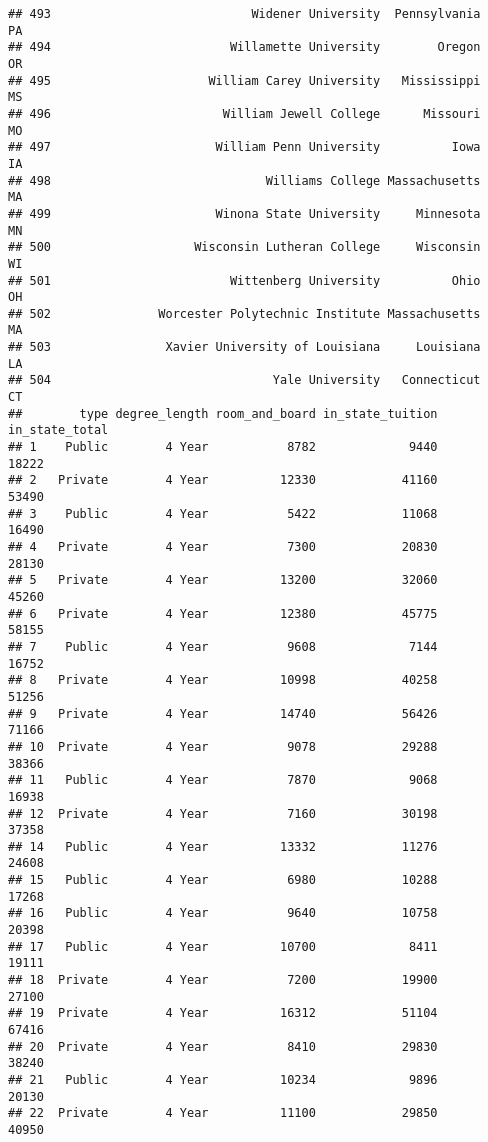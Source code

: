 \documentclass[
]{article}
\begin{document}
\begin{verbatim}
## 493                            Widener University  Pennsylvania         PA
## 494                         Willamette University        Oregon         OR
## 495                      William Carey University   Mississippi         MS
## 496                        William Jewell College      Missouri         MO
## 497                       William Penn University          Iowa         IA
## 498                              Williams College Massachusetts         MA
## 499                       Winona State University     Minnesota         MN
## 500                    Wisconsin Lutheran College     Wisconsin         WI
## 501                         Wittenberg University          Ohio         OH
## 502               Worcester Polytechnic Institute Massachusetts         MA
## 503                Xavier University of Louisiana     Louisiana         LA
## 504                               Yale University   Connecticut         CT
##        type degree_length room_and_board in_state_tuition in_state_total
## 1    Public        4 Year           8782             9440          18222
## 2   Private        4 Year          12330            41160          53490
## 3    Public        4 Year           5422            11068          16490
## 4   Private        4 Year           7300            20830          28130
## 5   Private        4 Year          13200            32060          45260
## 6   Private        4 Year          12380            45775          58155
## 7    Public        4 Year           9608             7144          16752
## 8   Private        4 Year          10998            40258          51256
## 9   Private        4 Year          14740            56426          71166
## 10  Private        4 Year           9078            29288          38366
## 11   Public        4 Year           7870             9068          16938
## 12  Private        4 Year           7160            30198          37358
## 14   Public        4 Year          13332            11276          24608
## 15   Public        4 Year           6980            10288          17268
## 16   Public        4 Year           9640            10758          20398
## 17   Public        4 Year          10700             8411          19111
## 18  Private        4 Year           7200            19900          27100
## 19  Private        4 Year          16312            51104          67416
## 20  Private        4 Year           8410            29830          38240
## 21   Public        4 Year          10234             9896          20130
## 22  Private        4 Year          11100            29850          40950

\end{verbatim}
\end{document}
